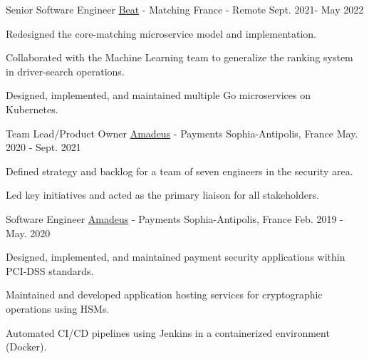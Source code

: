 \begin{cventries}
  \cventry
    {Senior Software Engineer} %
    {\href{https://thebeat.co/en/}{Beat} - Matching} %
    {France - Remote} %
    {Sept. 2021- May 2022} %
    {
      \begin{cvitems} %
        \item {Redesigned the core-matching microservice model and implementation.}
        \item {Collaborated with the Machine Learning team to generalize the ranking system in driver-search operations.}
        \item {Designed, implemented, and maintained multiple Go microservices on Kubernetes.}
      \end{cvitems}
    }

  \cventry
    {Team Lead/Product Owner} %
    {\href{https://amadeus.com/}{Amadeus} - Payments} %
    {Sophia-Antipolis, France} %
    {May. 2020 - Sept. 2021} %
    {
      \begin{cvitems} %
        \item {Defined strategy and backlog for a team of seven engineers in the security area.}
        \item {Led key initiatives and acted as the primary liaison for all stakeholders.}
      \end{cvitems}
    }
  \cventry
    {Software Engineer} %
    {\href{https://amadeus.com/}{Amadeus} - Payments} %
    {Sophia-Antipolis, France} %
    {Feb. 2019 - May. 2020} %
    {
      \begin{cvitems} %
        \item {Designed, implemented, and maintained payment security applications within PCI-DSS standards.}
        \item {Maintained and developed application hosting services for cryptographic operations using HSMs.}
        \item {Automated CI/CD pipelines using Jenkins in a containerized environment (Docker).}
      \end{cvitems}
    }


\end{cventries}

